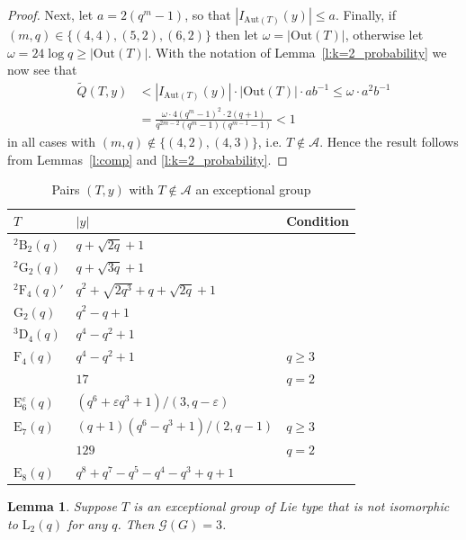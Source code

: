 \documentclass[twoside,a4paper,reqno,11pt]{amsart}
\newcommand{\e}{\varepsilon}
\newcommand{\<}{\langle}
\renewcommand{\>}{\rangle}
\newcommand{\leqs}{\leqslant}
\newcommand{\geqs}{\geqslant}
\newcommand{\Aut}{\mathrm{Aut}}
\newcommand{\Out}{\mathrm{Out}}
\newcommand{\LL}{\mathrm{L}}
\newtheorem{lem}[thm]{Lemma}
\theoremstyle{definition}
\begin{document}
\begin{proof}
    Next,  let $a = 2(q^m-1)$, so that 
	$|I_{\Aut(T)}(y)| \leqs a$.
	Finally, if $(m,q)\in\{(4,4),(5,2),(6,2)\}$ then let $\omega = |\Out(T)|$, otherwise let $\omega = 24\log q \geqs |\Out(T)|$. With the notation of Lemma~\ref{l:k=2_probability} we now see that 
	\begin{equation*}
	\begin{aligned}
	\widetilde{Q}(T,y) &< |I_{\Aut(T)}(y)| \cdot |\Out(T)| \cdot ab^{-1} 
	\leqs \omega \cdot a^2b^{-1} \\
	& = \frac{\omega \cdot 4(q^{m}-1)^2\cdot 2(q+1)}{q^{2m-2}(q^m-1)(q^{m-1}-1)} < 1
	\end{aligned}
	\end{equation*}
	in all cases with $(m, q) \not \in \{(4, 2), (4, 3)\}$, i.e. $T\notin\mathcal{A}$. Hence the result follows from Lemmas~\ref{l:comp} and \ref{l:k=2_probability}.
\end{proof}




{\small
	\centering
    \begin{table}
		\caption{Pairs $(T,y)$ with $T\notin \mathcal{A}$ an exceptional group}
		\begin{tabular}{@{}lll@{}}
			\toprule
			$T$ & $|y|$  & Condition \\ \midrule
			${^2}\mathrm{B}_2(q)$ & $q+\sqrt{2q}+1$ &\\
			${^2}\mathrm{G}_2(q)$ & $q+\sqrt{3q}+1$ &\\
			${^2}\mathrm{F}_4(q)'$ & $q^2+\sqrt{2q^3}+q+\sqrt{2q}+1$ & \\
			$\mathrm{G}_2(q)$ & $q^2-q+1$ & \\
			${^3}\mathrm{D}_4(q)$ & $q^4-q^2+1$ &\\
			$\mathrm{F}_4(q)$ & $q^4-q^2+1$ &$q\geqslant 3$\\
			& $17$ &$q=2$\\
			$\mathrm{E}_6^\e(q)$ & $(q^6+\e q^3+1)/(3,q-\e)$ &\\
			$\mathrm{E}_7(q)$ & $(q+1)(q^6-q^3+1)/(2,q-1)$ &$q\geqslant 3$\\
			& $129$ &$q=2$ \\
			$\mathrm{E}_8(q)$ & $q^8+q^7-q^5-q^4-q^3+q+1$ & \\
			\bottomrule
		\end{tabular}
		\label{tab:excep_uni}
	\end{table}
}

\begin{lem}
    \label{l:k=2_greedy_excep}
    Suppose $T$ is an exceptional group of Lie type that is not isomorphic to $\LL_2(q)$ for any $q$. Then $\mathcal{G}(G) = 3$.
\end{lem}
\end{document}
